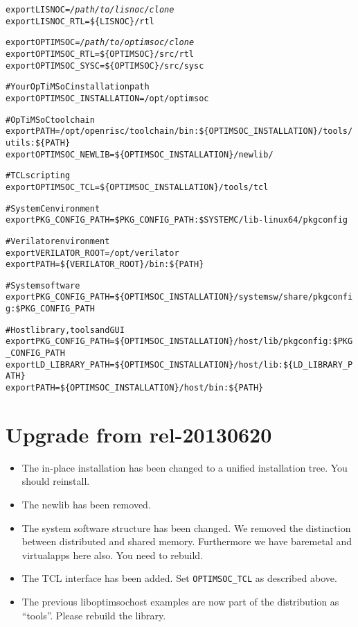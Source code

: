 \begin{alltt}
export LISNOC=\emph{/path/to/lisnoc/clone}
export LISNOC_RTL=\$\{LISNOC\}/rtl

export OPTIMSOC=\emph{/path/to/optimsoc/clone}
export OPTIMSOC_RTL=\$\{OPTIMSOC\}/src/rtl
export OPTIMSOC_SYSC=\$\{OPTIMSOC\}/src/sysc

# Your OpTiMSoC installation path
export OPTIMSOC_INSTALLATION=/opt/optimsoc

# OpTiMSoC toolchain
export PATH=/opt/openrisc/toolchain/bin:\$\{OPTIMSOC_INSTALLATION\}/tools/utils:\$\{PATH\}
export OPTIMSOC_NEWLIB=\$\{OPTIMSOC_INSTALLATION\}/newlib/

# TCL scripting
export OPTIMSOC_TCL=\$\{OPTIMSOC_INSTALLATION\}/tools/tcl

# SystemC environment
export PKG_CONFIG_PATH=\$PKG_CONFIG_PATH:\$SYSTEMC/lib-linux64/pkgconfig

# Verilator environment
export VERILATOR\_ROOT=/opt/verilator
export PATH=\$\{VERILATOR_ROOT\}/bin:\$\{PATH\}

# System software
export PKG_CONFIG_PATH=\$\{OPTIMSOC_INSTALLATION\}/systemsw/share/pkgconfig:\$PKG_CONFIG_PATH

# Host library, tools and GUI
export PKG_CONFIG_PATH=\$\{OPTIMSOC_INSTALLATION\}/host/lib/pkgconfig:\$PKG_CONFIG_PATH
export LD_LIBRARY_PATH=\$\{OPTIMSOC_INSTALLATION\}/host/lib:\$\{LD_LIBRARY_PATH\}
export PATH=\$\{OPTIMSOC_INSTALLATION\}/host/bin:\$\{PATH\}
\end{alltt}

\section{Upgrade from rel-20130620}

\begin{itemize}
\item The in-place installation has been changed to a unified
  installation tree. You should reinstall.
\item The newlib has been removed.
\item The system software structure has been changed. We removed the
  distinction between distributed and shared memory. Furthermore we
  have baremetal and virtualapps here also. You need to rebuild.
\item The TCL interface has been added. Set \verb|OPTIMSOC_TCL| as
  described above.
\item The previous liboptimsochost examples are now part of the
  distribution as ``tools''. Please rebuild the library.
\end{itemize}